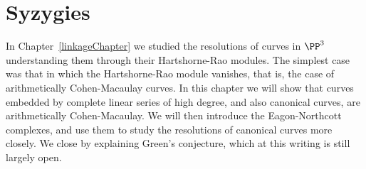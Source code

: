 

\chapter{Syzygies}
\label{SyzygiesChapter}

%
%
%
%
%
\def\length{{\rm length}}

%
%


In Chapter~\ref{linkageChapter} we studied the resolutions of curves in $\PP^3$ understanding them through their Hartshorne-Rao modules. The
simplest case was that in which the Hartshorne-Rao module vanishes, that is, the case of arithmetically Cohen-Macaulay curves.
In this chapter we will show that curves embedded by complete linear series of high degree, and also canonical curves, are arithmetically
Cohen-Macaulay. We will then introduce the Eagon-Northcott complexes, and use them to study the resolutions of canonical curves
more closely. We close by explaining Green's conjecture, which at this writing is still largely open.


